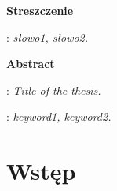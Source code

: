 \documentclass[12pt, a4paper]{report} %
\begin{document}
\begin{titlepage}
    \newpage\thispagestyle{empty}
    \vspace*{2\baselineskip}
    \begin{center}
	{\large\bfseries Streszczenie}\par\bigskip
    \end{center}

    {\itshape
    }
    \vspace*{1\baselineskip}

    : {\itshape słowo1, słowo2.}
    \par
    \vspace{4\baselineskip}

    \begin{center}
	{\large\bfseries Abstract}\par\bigskip
    \end{center}
    : {\itshape Title of the thesis.}\par
    \vspace*{1\baselineskip}
    {\itshape
    }
    \vspace*{1\baselineskip}

    : {\itshape keyword1, keyword2.}

\end{titlepage}


\tableofcontents %


\chapter*{Wstęp} %


\end{document}
